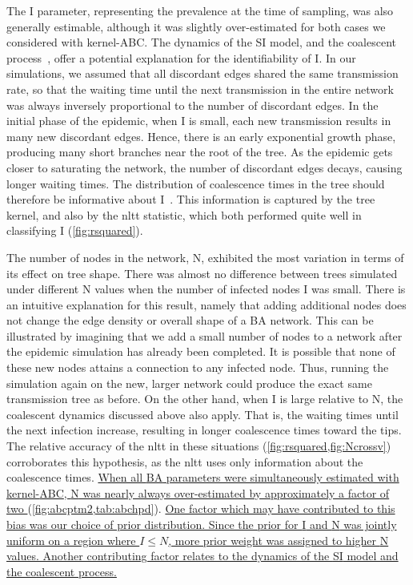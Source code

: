 The \gls{I} parameter, representing the prevalence at the time of sampling, was
also generally estimable, although it was slightly over-estimated for both
cases we considered with kernel-\gls{ABC}. The dynamics of the \gls{SI} model,
and the coalescent process~\autocite{kingman1982coalescent}, offer a potential
explanation for the identifiability of \gls{I}. In our simulations, we assumed
that all discordant edges shared the same transmission rate, so that the
waiting time until the next transmission in the entire network was always
inversely proportional to the number of discordant edges. In the initial phase
of the epidemic, when \gls{I} is small, each new transmission results in many
new discordant edges. Hence, there is an early exponential growth phase,
producing many short branches near the root of the tree. As the epidemic gets
closer to saturating the network, the number of discordant edges decays,
causing longer waiting times. The distribution of coalescence times in the tree
should therefore be informative about \gls{I}~\autocite{volz2009phylodynamics}.
This information is captured by the tree kernel, and also by the \gls{nltt}
statistic, which both performed quite well in classifying \gls{I}
(\cref{fig:rsquared}). 

The number of nodes in the network, \gls{N}, exhibited the most variation in
terms of its effect on tree shape. There was almost no difference between trees
simulated under different \gls{N} values when the number of infected nodes
\gls{I} was small. There is an intuitive explanation for this result, namely
that adding additional nodes does not change the edge density or overall shape
of a \gls{BA} network. This can be illustrated by imagining that we add a small
number of nodes to a network after the epidemic simulation has already been
completed. It is possible that none of these new nodes attains a connection to
any infected node. Thus, running the simulation again on the new, larger
network could produce the exact same transmission tree as before. On the other
hand, when \gls{I} is large relative to \gls{N}, the coalescent dynamics
discussed above also apply. That is, the waiting times until the next infection
increase, resulting in longer coalescence times toward the tips. The relative
accuracy of the \gls{nltt} in these situations
(\cref{fig:rsquared,fig:Ncrossv}) corroborates this hypothesis, as the
\gls{nltt} uses only information about the coalescence times. 
\uline{When all \gls{BA}
parameters were simultaneously estimated with kernel-\gls{ABC}, \gls{N} was
nearly always over-estimated by approximately a factor of two
}(\cref{fig:abcptm2,tab:abchpd}). \uline{One factor which may have contributed to this
bias was our choice of prior distribution. Since the prior for \gls{I} and
\gls{N} was jointly uniform on a region where $I \leq N$, more prior weight was
assigned to higher \gls{N} values. Another contributing factor relates to the
dynamics of the \gls{SI} model and the coalescent process.
}

